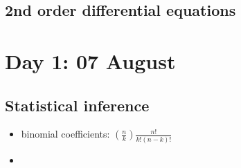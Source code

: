 \documentclass{article}
\begin{document}
\begin{multicols*}{2}
\begin{itemize}
\begin{enumerate}
    \end{enumerate}

\end{itemize}

\subsection{2nd order differential equations}


\section{Day 1: 07 August}
\subsection{Statistical inference}
\begin{itemize}
    \item binomial coefficients: $ (\frac{n}{k})  \frac{n!}{k!(n-k)!}$
    \item 
\end{itemize}


\end{multicols*}
\end{document}
